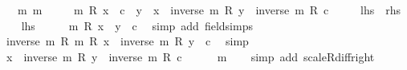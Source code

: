 \begin{isabellebody}
\ \ \ m{}{\isacharcolon}{\kern0pt}\ {\isachardoublequoteopen}m\ {\isasymnoteq}\ {}{\isachardoublequoteclose}\isanewline
\ \ \ {\isachardoublequoteopen}m\ {\isacharasterisk}{\kern0pt}\isactrlsub R\ x\ {\isacharplus}{\kern0pt}\ c\ {\isacharequal}{\kern0pt}\ y\ {\isasymlongleftrightarrow}\ x\ {\isacharequal}{\kern0pt}\ inverse\ m\ {\isacharasterisk}{\kern0pt}\isactrlsub R\ y\ {\isacharminus}{\kern0pt}\ {\isacharparenleft}{\kern0pt}inverse\ m\ {\isacharasterisk}{\kern0pt}\isactrlsub R\ c{\isacharparenright}{\kern0pt}{\isachardoublequoteclose}\isanewline
\ \ \ \ {\isacharparenleft}{\kern0pt}\ {\isachardoublequoteopen}{\isacharquery}{\kern0pt}lhs\ {\isasymlongleftrightarrow}\ {\isacharquery}{\kern0pt}rhs{\isachardoublequoteclose}{\isacharparenright}{\kern0pt}\isanewline
%
\isadelimproof
%
\endisadelimproof
%
\isatagproof
{}\isamarkupfalse%
\isanewline
\ \ \isamarkupfalse%
\ {\isacharquery}{\kern0pt}lhs\isanewline
\ \ \isamarkupfalse%
\ \isamarkupfalse%
\ {\isachardoublequoteopen}m\ {\isacharasterisk}{\kern0pt}\isactrlsub R\ x\ {\isacharequal}{\kern0pt}\ y\ {\isacharminus}{\kern0pt}\ c{\isachardoublequoteclose}\ \isamarkupfalse%
\ {\isacharparenleft}{\kern0pt}simp\ add{\isacharcolon}{\kern0pt}\ field{\isacharunderscore}{\kern0pt}simps{\isacharparenright}{\kern0pt}\isanewline
\ \ \isamarkupfalse%
\ \isamarkupfalse%
\ {\isachardoublequoteopen}inverse\ m\ {\isacharasterisk}{\kern0pt}\isactrlsub R\ {\isacharparenleft}{\kern0pt}m\ {\isacharasterisk}{\kern0pt}\isactrlsub R\ x{\isacharparenright}{\kern0pt}\ {\isacharequal}{\kern0pt}\ inverse\ m\ {\isacharasterisk}{\kern0pt}\isactrlsub R\ {\isacharparenleft}{\kern0pt}y\ {\isacharminus}{\kern0pt}\ c{\isacharparenright}{\kern0pt}{\isachardoublequoteclose}\ \isamarkupfalse%
\ simp\isanewline
\ \ \isamarkupfalse%
\ \isamarkupfalse%
\ {\isachardoublequoteopen}x\ {\isacharequal}{\kern0pt}\ inverse\ m\ {\isacharasterisk}{\kern0pt}\isactrlsub R\ y\ {\isacharminus}{\kern0pt}\ {\isacharparenleft}{\kern0pt}inverse\ m\ {\isacharasterisk}{\kern0pt}\isactrlsub R\ c{\isacharparenright}{\kern0pt}{\isachardoublequoteclose}\isanewline
\ \ \ \ \isamarkupfalse%
\ m{}\isanewline
\ \ \isamarkupfalse%
\ {\isacharparenleft}{\kern0pt}simp\ add{\isacharcolon}{\kern0pt}\ scaleR{\isacharunderscore}{\kern0pt}diff{\isacharunderscore}{\kern0pt}right{\isacharparenright}{\kern0pt}\isanewline

\end{isabellebody}
